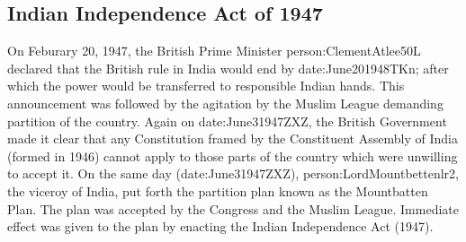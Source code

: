 \subsection{Indian Independence Act of 1947}

On Feburary 20, 1947, the British Prime Minister \gls{person:ClementAtlee50L} declared that the British rule in India would end by \gls{date:June201948TKn}; after which the power would be transferred to responsible Indian hands. This announcement was followed by the agitation by the Muslim League demanding partition of the country. Again on \gls{date:June31947ZXZ}, the British Government made it clear that any Constitution framed by the Constituent Assembly of India (formed in 1946) cannot apply to those parts of the country which were unwilling to accept it. On the same day (\gls{date:June31947ZXZ}), \gls{person:LordMountbettenlr2}, the viceroy of India, put forth the partition plan known as the Mountbatten Plan. The plan was accepted by the Congress and the Muslim League. Immediate effect was given to the plan by enacting the Indian Independence Act (1947).


